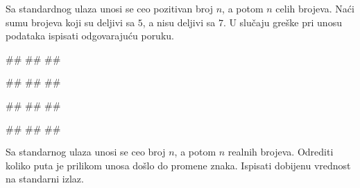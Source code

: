 \begin{Exercise}[label=p1.7_] 
Sa standardnog ulaza unosi se ceo pozitivan broj $n$, a potom $n$
celih brojeva.  Naći sumu brojeva koji su deljivi sa $5$, a nisu
deljivi sa $7$. U slučaju greške pri unosu podataka ispisati odgovarajuću poruku.


\begin{miditest}
\begin{upotreba}{1}
#\naslovInt#
##
##
\end{upotreba}
\end{miditest}
\begin{miditest}
\begin{upotreba}{2}
#\naslovInt#
##
##
\end{upotreba}
\end{miditest}

\begin{miditest}
\begin{upotreba}{3}
#\naslovInt#
##
##
\end{upotreba}
\end{miditest}
\begin{miditest}
\begin{upotreba}{4}
#\naslovInt#
##
##
\end{upotreba}
\end{miditest}
\end{Exercise}
\begin{Answer}[ref=p1.7_]
\end{Answer}


\begin{Exercise}[label=p1.7_] 
Sa standarnog ulaza unosi se ceo broj $n$, a potom $n$ realnih
brojeva. Odrediti koliko puta je prilikom unosa došlo do promene
znaka. Ispisati dobijenu vrednost na standarni izlaz.\\ 
\end{Exercise}
\begin{Answer}[ref=p1.7_]
\end{Answer}


